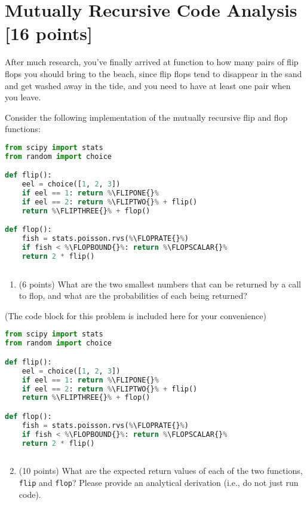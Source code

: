 \newpage
\section{Mutually Recursive Code Analysis [16 points]}\label{sec:mutual}
After much research, you've finally arrived at function to how many pairs of flip flops you should bring to the beach, since flip flops tend to disappear in the sand and get washed away in the tide, and you need to have at least one pair when you leave.

Consider the following implementation of the mutually recursive flip and flop functions: \\

\begin{lstlisting}[escapechar=\%, language=python,frame=single]
from scipy import stats
from random import choice

def flip():
    eel = choice([1, 2, 3])
    if eel == 1: return %\FLIPONE{}%
    if eel == 2: return %\FLIPTWO{}% + flip()
    return %\FLIPTHREE{}% + flop()

def flop():
    fish = stats.poisson.rvs(%\FLOPRATE{}%)
    if fish < %\FLOPBOUND{}%: return %\FLOPSCALAR{}%
    return 2 * flip()
    
\end{lstlisting}

\begin{enumerate}[label=\alph*.]

\item (6 points) What are the two smallest numbers that can be returned by a call to flop, and what are the probabilities of each being returned?
	
		
		
		
\end{enumerate}
(The code block for this problem is included here for your convenience)
\begin{lstlisting}[escapechar=\%, language=python,frame=single]
from scipy import stats
from random import choice

def flip():
    eel = choice([1, 2, 3])
    if eel == 1: return %\FLIPONE{}%
    if eel == 2: return %\FLIPTWO{}% + flip()
    return %\FLIPTHREE{}% + flop()

def flop():
    fish = stats.poisson.rvs(%\FLOPRATE{}%)
    if fish < %\FLOPBOUND{}%: return %\FLOPSCALAR{}%
    return 2 * flip()
    
\end{lstlisting}
\begin{enumerate}[label=\alph*.]
\setcounter{enumi}{1}
\item (10 points) What are the expected return values of each of the two functions, \texttt{flip} and \texttt{flop}? Please provide an analytical derivation (i.e., do not just run code).
	

\end{enumerate}

